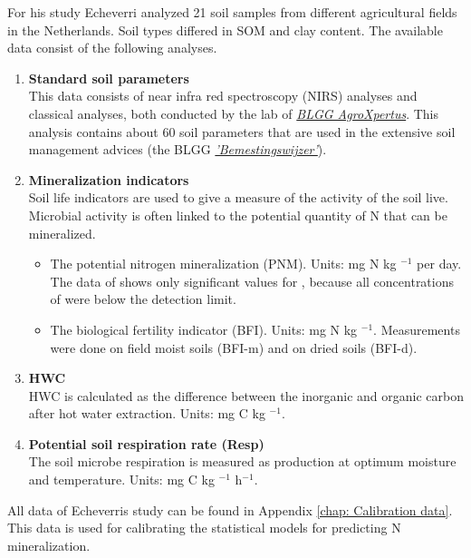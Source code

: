\documentclass[10pt,twoside,dutch,english]{report}
\begin{document}
For his study Echeverri analyzed 21 soil samples from different agricultural fields in the Netherlands. Soil types differed in SOM and clay content. 
The available data consist of the following analyses. 

	\begin{enumerate}
	\item \textbf{Standard soil parameters} \\
	This data consists of near infra red spectroscopy (NIRS) analyses and classical analyses, both conducted by the lab of \href{http://blgg.agroxpertus.nl/}{\textit{BLGG AgroXpertus}}. This analysis contains about 60 soil parameters that are used in the extensive soil management advices (the BLGG \href{http://blgg.agroxpertus.nl/product/bemesting/bemestingswijzer-bouwland}{\textit{'Bemestingswijzer'}}). 
	
	\item \textbf{Mineralization indicators}\\
	Soil life indicators are used to give a measure of the activity of the soil live. Microbial activity is often linked to the potential quantity of N that can be mineralized. 
	\begin{itemize}
		\item The potential nitrogen mineralization (PNM).  Units: mg N kg $^{-1}$ per day. The data of \citep{Echeverri2014} shows only significant values for , because all concentrations of  were below the detection limit. 
		\item The biological fertility indicator (BFI). Units: mg N kg $^{-1}$. Measurements were done on field moist soils (BFI-m) and on dried soils (BFI-d). 
	\end{itemize}
	
	\item \textbf{HWC} \\
	HWC is calculated as the difference between the inorganic and organic carbon after hot water extraction. Units: mg C kg $^{-1}$.   
	
	\item \textbf{Potential soil respiration rate (Resp)}\\
	The soil microbe respiration is measured as  production at optimum moisture and temperature. Units: mg C kg $^{-1}$ h$^{-1}$.   
\end{enumerate}

All data of Echeverris study can be found in Appendix \autoref{chap: Calibration data}. This data is used for calibrating the statistical models for predicting N mineralization.  
\end{document}
